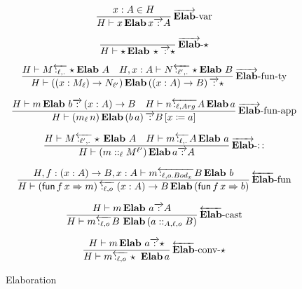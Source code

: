 \begin{figure}
\[
\frac{
  x:A\in H
}{
  H\vdash x\,\textbf{Elab}\,x\overrightarrow{\,:\,}A
}
\operatorname{\overrightarrow{\textbf{Elab}}-var}
\]

\[
\frac{\,}{H\vdash\star\,\textbf{Elab}\,\star\overrightarrow{\,:\,}\star}
\operatorname{\overrightarrow{\textbf{Elab}}-\star}
\]

\[
\frac{
  H\vdash M\overleftarrow{\,:_{\ell,.}\,}\star\textbf{Elab}\ A\quad H,x:A\vdash N\overleftarrow{\,:_{\ell',.}\,}\star\textbf{Elab}\ B
}{
  H\vdash\left(\left(x:M_{\ell}\right)\rightarrow N_{\ell'}\right)\textbf{Elab}\left(\left(x:A\right)\rightarrow B\right)\overrightarrow{\,:\,}\star
}
\operatorname{\overrightarrow{\textbf{Elab}}-fun-ty}
\]

\[
\frac{H\vdash m\,\textbf{Elab}\ b\overrightarrow{\,:\,}\left(x:A\right)\rightarrow B\quad H\vdash n\overleftarrow{\,:_{\ell,Arg}\,}A\,\textbf{Elab}\,a}{H\vdash\left(m_{\ell}\,n\right)\textbf{Elab}\left(b\,a\right)\overrightarrow{\,:\,}B\left[x\coloneqq a\right]}\rulename{\overrightarrow{\textbf{Elab}}-fun-app}
\]

\[
\frac{H\vdash M\overleftarrow{\,:_{\ell',.}\,}\star\,\textbf{Elab}\ A\quad H\vdash m\overleftarrow{\,:_{\ell,.}\,}A\,\textbf{Elab}\ a}{H\vdash\left(m::_{\ell}M^{\ell'}\right)\textbf{Elab}\,a\overrightarrow{\,:\,}A}
\rulename{\overrightarrow{\textbf{Elab}}-::}
\]

\[
\frac{H,f:\left(x:A\right)\rightarrow B,x:A\vdash m\overleftarrow{\,:_{\ell,o.Bod_x}\,}B\,\textbf{Elab}\ b}{H\vdash\left(\mathsf{fun}\,f\,x\Rightarrow m\right)\overleftarrow{\,:_{\ell,o}\,}\left(x:A\right)\rightarrow B\,\textbf{Elab}\left(\mathsf{fun}\,f\,x\Rightarrow b\right)}\rulename{\overleftarrow{\textbf{Elab}}-fun}
\]

\[
\frac{H\vdash m\,\textbf{Elab}\ a\overrightarrow{\,:\,}A}{H\vdash m\overleftarrow{\,:_{\ell,o}\,}B\ \textbf{Elab}\left(a::_{A,\ell,o}B\right)}\rulename{\overleftarrow{\textbf{Elab}}-cast}
\]

\[
\frac{H\vdash m\,\textbf{Elab}\ a\overrightarrow{\,:\,}\star}{H\vdash m\overleftarrow{\,:_{\ell,o}\,}\star\ \textbf{Elab}\,a}
\rulename{\overleftarrow{\textbf{Elab}}-conv-\star}
\]


\caption{Elaboration}
\label{fig:elaboration}
\end{figure}



